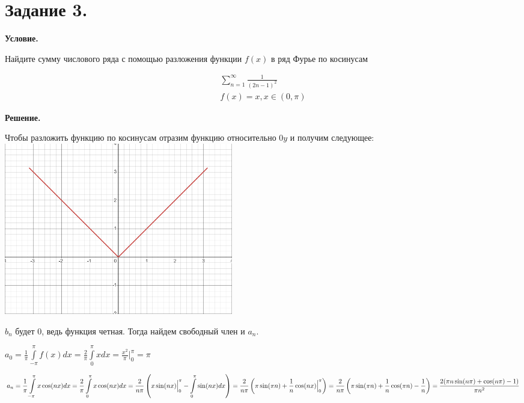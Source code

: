 \section{Задание 3.}

\textbf{Условие.}

Найдите сумму числового ряда с помощью разложения функции $f(x)$ в ряд Фурье по косинусам

\begin{gather*}
    \sum_{n = 1}^\infty \frac{1}{(2n - 1)^2} \\
    f(x) = x, x \in (0, \pi)
\end{gather*}

\vspace{10mm}

\textbf{Решение.}

Чтобы разложить функцию по косинусам отразим функцию относительно $0y$ и получим следующее:\\

\includegraphics[width=10cm]{images/3-01}

$b_n$ будет 0, ведь функция четная. Тогда найдем свободный член и $a_n$.

{$\displaystyle a_0 = \frac{1}{\pi}\int\limits_{-\pi}^{\pi} f(x) dx = \frac{2}{\pi}\int\limits_{0}^{\pi} x dx =
\frac{x^2}{\pi}\Big|_{0}^{\pi} = \pi$}

{$\displaystyle a_n = \frac{1}{\pi}\int\limits_{-\pi}^{\pi}x \cos(nx)dx = \frac{2}{\pi}\int\limits_{0}^{\pi}x \cos(nx)dx =
\frac{2}{n\pi}\left( x\sin(nx) \Big|_{0}^{\pi}- \int\limits_{0}^{\pi}\sin(nx)dx\right) = \\
\frac{2}{n\pi}\left(\pi\sin(\pi n) + \frac{1}{n}\cos( nx)\Big|_{0}^{\pi}\right) = 
\frac{2}{n\pi}\left(\pi\sin(\pi n) + \frac{1}{n}\cos(\pi n) - \frac{1}{n}\right) =
\frac{2(\pi n \sin(n\pi) + \cos(n\pi) - 1)}{\pi n^2}$}\\

